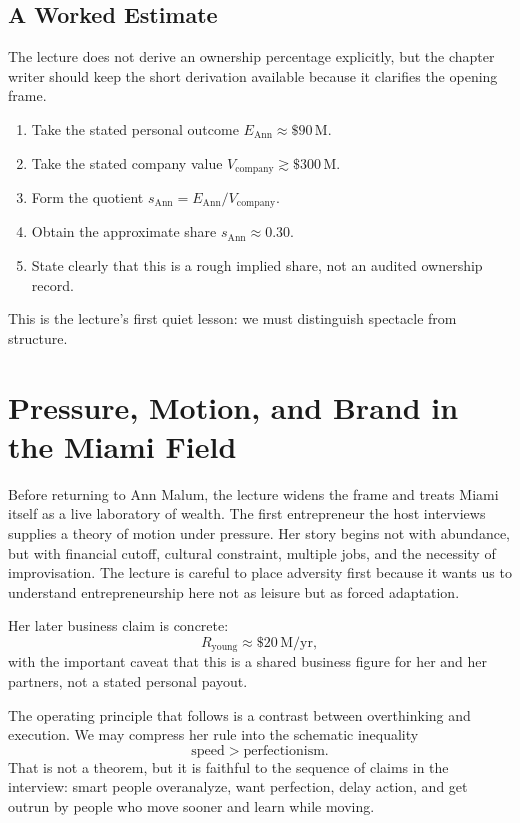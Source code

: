 \subsection{A Worked Estimate}

The lecture does not derive an ownership percentage explicitly, but the chapter writer should keep the short derivation available because it clarifies the opening frame.

\begin{enumerate}
\item Take the stated personal outcome \(E_{\mathrm{Ann}} \approx \$90\,\mathrm{M}\).
\item Take the stated company value \(V_{\mathrm{company}} \gtrsim \$300\,\mathrm{M}\).
\item Form the quotient \(s_{\mathrm{Ann}} = E_{\mathrm{Ann}}/V_{\mathrm{company}}\).
\item Obtain the approximate share \(s_{\mathrm{Ann}} \approx 0.30\).
\item State clearly that this is a rough implied share, not an audited ownership record.
\end{enumerate}

This is the lecture's first quiet lesson: we must distinguish spectacle from structure.

\section{Pressure, Motion, and Brand in the Miami Field}

Before returning to Ann Malum, the lecture widens the frame and treats Miami itself as a live laboratory of wealth. The first entrepreneur the host interviews supplies a theory of motion under pressure. Her story begins not with abundance, but with financial cutoff, cultural constraint, multiple jobs, and the necessity of improvisation. The lecture is careful to place adversity first because it wants us to understand entrepreneurship here not as leisure but as forced adaptation.

Her later business claim is concrete:
\begin{equation}
R_{\mathrm{young}} \approx \$20\,\mathrm{M}/\mathrm{yr},
\end{equation}
with the important caveat that this is a shared business figure for her and her partners, not a stated personal payout.

The operating principle that follows is a contrast between overthinking and execution. We may compress her rule into the schematic inequality
\begin{equation}
\text{speed} > \text{perfectionism}.
\end{equation}
That is not a theorem, but it is faithful to the sequence of claims in the interview: smart people overanalyze, want perfection, delay action, and get outrun by people who move sooner and learn while moving.

